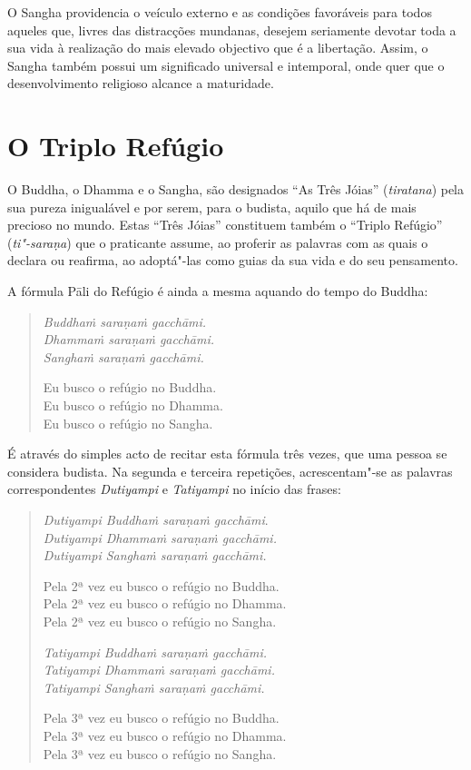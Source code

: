 O Sangha providencia o veículo externo e as condições favoráveis para
todos aqueles que, livres das distracções mundanas, desejem seriamente devotar
toda a sua vida à realização do mais elevado objectivo que é a libertação.
Assim, o Sangha também possui um significado universal e intemporal, onde
quer que o desenvolvimento religioso alcance a maturidade.

\section{O Triplo Refúgio}

O Buddha, o Dhamma e o Sangha, são designados ``As Três Jóias''
(\emph{tiratana}) pela sua pureza inigualável e por serem, para o budista,
aquilo que há de mais precioso no mundo. Estas ``Três Jóias'' constituem também
o ``Triplo Refúgio'' (\emph{ti"-saraṇa}) que o praticante assume, ao proferir as
palavras com as quais o declara ou reafirma, ao adoptá"-las como guias da sua
vida e do seu pensamento.

A fórmula Pāli do Refúgio é ainda a mesma aquando do tempo do Buddha:

\begin{verse}
  \emph{Buddhaṁ saraṇaṁ gacchāmi.}\\
  \emph{Dhammaṁ saraṇaṁ gacchāmi.}\\
  \emph{Sanghaṁ saraṇaṁ gacchāmi.}

  Eu busco o refúgio no Buddha.\\
  Eu busco o refúgio no Dhamma.\\
  Eu busco o refúgio no Sangha.
\end{verse}

É através do simples acto de recitar esta fórmula três vezes, que uma pessoa se
considera budista. Na segunda e terceira repetições, acrescentam"-se as palavras
correspondentes \emph{Dutiyampi} e \emph{Tatiyampi} no início das frases:

\begin{verse}
  \emph{Dutiyampi Buddhaṁ saraṇaṁ gacchāmi}.\\
  \emph{Dutiyampi Dhammaṁ saraṇaṁ gacchāmi.}\\
  \emph{Dutiyampi Sanghaṁ saraṇaṁ gacchāmi.}

  Pela 2ª vez eu busco o refúgio no Buddha.\\
  Pela 2ª vez eu busco o refúgio no Dhamma.\\
  Pela 2ª vez eu busco o refúgio no Sangha.

  \emph{Tatiyampi Buddhaṁ saraṇaṁ gacchāmi.}\\
  \emph{Tatiyampi Dhammaṁ saraṇaṁ gacchāmi.}\\
  \emph{Tatiyampi Sanghaṁ saraṇaṁ gacchāmi.}

  Pela 3ª vez eu busco o refúgio no Buddha.\\
  Pela 3ª vez eu busco o refúgio no Dhamma.\\
  Pela 3ª vez eu busco o refúgio no Sangha.
\end{verse}

